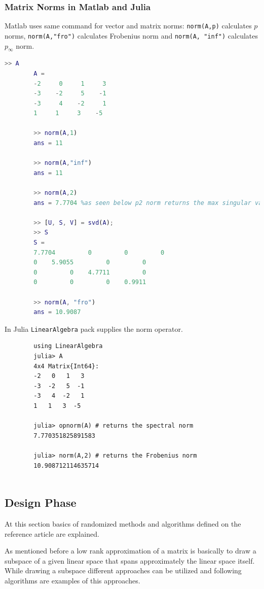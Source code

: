 \documentclass[11pt,a4paper]{article}
\theoremstyle{definition}
\begin{document}
	\subsubsection{Matrix Norms in Matlab and Julia}
	Matlab uses same command for vector and matrix norms: \texttt{norm(A,p)} calculates $p$ norms, \texttt{norm(A,"fro")} calculates Frobenius norm and \texttt{norm(A, "inf")} calculates $ p_\infty $ norm.
	
	\begin{lstlisting}[language=Matlab]
		>> A
		A =
		-2     0     1     3
		-3    -2     5    -1
		-3     4    -2     1
		1     1     3    -5
		
		>> norm(A,1)
		ans = 11
		
		>> norm(A,"inf")
		ans = 11
		
		>> norm(A,2)
		ans = 7.7704 %as seen below p2 norm returns the max singular value
		
		>> [U, S, V] = svd(A);
		>> S
		S =
		7.7704         0         0         0
		0    5.9055         0         0
		0         0    4.7711         0
		0         0         0    0.9911
		
		>> norm(A, "fro")
		ans = 10.9087
	\end{lstlisting}

	In Julia \texttt{LinearAlgebra} pack supplies the norm operator.
	\begin{lstlisting}
		using LinearAlgebra
		julia> A
		4x4 Matrix{Int64}:
		-2   0   1   3
		-3  -2   5  -1
		-3   4  -2   1
		1   1   3  -5
		
		julia> opnorm(A) # returns the spectral norm
		7.770351825891583
		
		julia> norm(A,2) # returns the Frobenius norm
		10.908712114635714
		

	\end{lstlisting}

	\subsection{Design Phase}
	At this section basics of randomized methods and algorithms defined on the reference article are explained. 
	
	As mentioned before a low rank approximation of a matrix is basically to draw a subspace of a given linear space that spans approximately the linear space itself. While drawing a subspace different approaches can be utilized and following algorithms are examples of this approaches.
	
\end{document}
